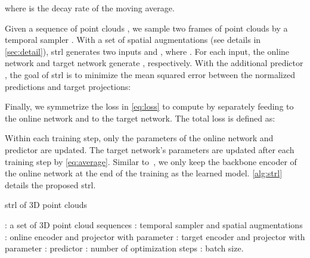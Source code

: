 \documentclass[10pt,twocolumn,letterpaper]{article}
\begin{document}
where  is the decay rate of the moving average.


Given a sequence of point clouds , we sample two frames of point clouds  by a temporal sampler . With a set of spatial augmentations  (see details in \cref{sec:detail}), \ac{strl} generates two inputs  and , where . For each input, the online network and target network generate , respectively. With the additional predictor , the goal of \ac{strl} is to minimize the mean squared error between the normalized predictions and target projections:


Finally, we symmetrize the loss in \cref{eq:loss} to compute  by separately feeding  to the online network and  to the target network. The total loss is defined as:


Within each training step, only the parameters of the online network and predictor are updated. The target network's parameters are updated after each training step by \cref{eq:average}. Similar to~\cite{he2020momentum,grill2020bootstrap}, we only keep the backbone encoder of the online network  at the end of the training as the learned model. \cref{alg:strl} details the proposed \ac{strl}.

\begin{algorithm}[ht!]
    \caption{\ac{strl} of 3D point clouds}
    \label{alg:strl}
    \small
    \SetAlgoLined
    \KwInput{}
    : a set of 3D point cloud sequences\;
    : temporal sampler and spatial augmentations\;
    : online encoder and projector with parameter \;
    : target encoder and projector with parameter \;
    : predictor\;
    : number of optimization steps\;
    : batch size.\\
\end{algorithm}
\end{document}
